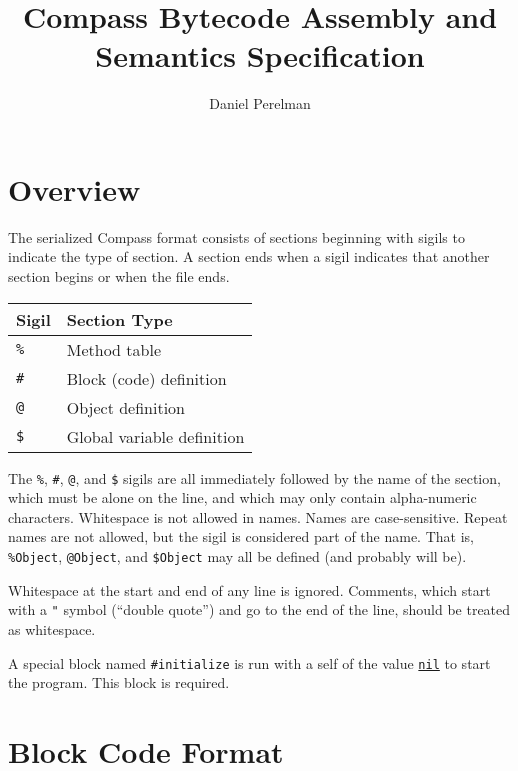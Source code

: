 \documentclass[letterpaper,12pt]{article}
\makeatletter
\newcommand{\Compass}{Compass}
\newcommand{\serializedCompass}{serialized \Compass}
\newcommand{\code}[1]{\texttt{#1}}
\newcommand{\smt}{\code{\%}}
\newcommand{\sblk}{\code{\#}}
\newcommand{\sobj}{\code{@}}
\newcommand{\sglb}{\code{\$}}
\newcommand{\scmt}{\code{"}}
\newcommand{\nil}{\hyperref[nil]{\code{nil}}}
\makeatother
\begin{document}
\title{Compass Bytecode Assembly and Semantics Specification}
\author{Daniel Perelman}
\maketitle

\tableofcontents

\section{Overview}

The \serializedCompass{} format consists of sections beginning with sigils
to indicate the type of section. A section ends when a sigil indicates
that another section begins or when the file ends.

\begin{tabular}{l|l}
    Sigil  & Section Type \\
    \hline
    \smt   & Method table \\
    \sblk  & Block (code) definition \\
    \sobj  & Object definition \\
    \sglb  & Global variable definition \\
\end{tabular}

The \smt, \sblk, \sobj, and \sglb{} sigils are all immediately followed
by the name of the section, which must be alone on the line, and which
may only contain alpha-numeric characters.
Whitespace is not allowed in names. Names are case-sensitive.
Repeat names are not allowed, but the sigil is considered part of the name.
That is, \smt\code{Object}, \sobj\code{Object}, and \sglb\code{Object}
may all be defined (and probably will be).

Whitespace at the start and end of any line is ignored. Comments,
which start with a \scmt{} symbol (``double quote'')
and go to the end of the line,
should be treated as whitespace.

A special block named \code{\sblk{}initialize} is run with a self of
the value \nil{} to start the program. This block is required.

\section{Block Code Format}

\newcommand{\mn}[1]{\hyperref[s:#1]{\code{\textbf{#1}}}}
\newcommand{\tableheader}[1]{\textbf{#1}}
\newcommand{\tsecheader}[1]{\hline & \textit{#1}}
\end{document}
